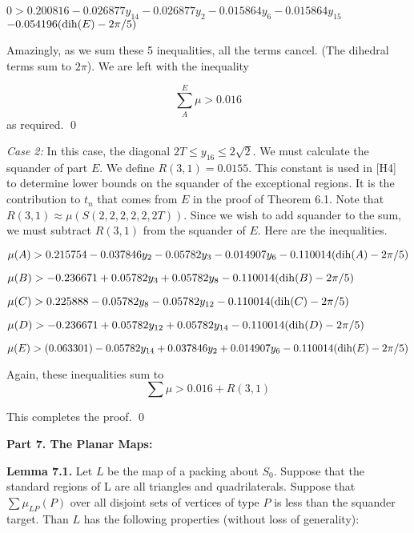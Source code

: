 $0 > 0.200816 - 0.026877 y_{14} - 0.026877 y_2 - 0.015864 y_6 - 0.015864 y_{15} $ \newline $ - 0.054196 (\operatorname{dih}(E)-2 \pi /5)$

Amazingly, as we sum these 5 inequalities, all the terms cancel.  (The dihedral terms sum to $2\pi$). We are left with the inequality 

$$\sum_{A}^E\mu > 0.016$$
 as required. 
\qed

{\it Case 2:} In this case, the diagonal $2T\le y_{16}\le 2\sqrt 2$.  We must calculate the squander of part $E$.  
We define $R(3,1)=0.0155$.  This constant is used in [H4] to determine lower bounds on the squander of the exceptional regions.  It is the
contribution to $t_n$ that comes from $E$ in the proof of Theorem 6.1.
Note that
$R(3,1)\approx \mu(S(2,2,2,2,2,2T))$.
Since we wish to add squander to the sum, we must subtract $R(3,1)$ from the squander of $E$.  Here are the inequalities.

$\mu(A) >  0.215754 - 0.037846 y_2 -0.05782 y_3 - 0.014907 y_6  - 0.110014 (\operatorname{dih}(A)-2 \pi /5)$\newline

$\mu(B) > - 0.236671 + 0.05782 y_3 + 0.05782 y_8  - 0.110014 (\operatorname{dih}(B)-2 \pi /5) $\newline

$\mu(C) > 0.225888 - 0.05782 y_8 -0.05782 y_{12}   
- 0.110014 (\operatorname{dih}(C)-2 \pi /5)$\newline

$\mu(D)> - 0.236671 + 0.05782 y_{12} + 0.05782 y_{14} - 0.110014 (\operatorname{dih}(D)-2 \pi /5)$\newline

$\mu(E) >  (0.063301) - 0.05782 y_{14} + 0.037846 y_2 + 0.014907 y_6 -  0.110014 (\operatorname{dih}(E)-2 \pi /5)$\newline


Again, these inequalities sum to $$\sum\mu > 0.016+R(3,1)$$

This completes the proof. \qed


\bigskip

\centerline{{\bf Part 7. The Planar Maps:}}
\bigskip

{\bf Lemma 7.1.} Let $L$ be the map of a packing about $S_0$.
Suppose that the standard regions of L are all triangles and quadrilaterals.  
Suppose that $\sum \mu_{LP}(P)$ over all disjoint sets of vertices of type $P$ is less than the squander target.  
Than $L$ has the following properties (without loss of generality): 

